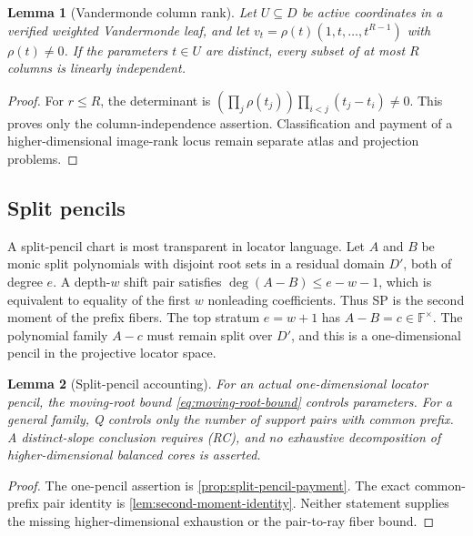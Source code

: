 \documentclass[12pt,a4paper]{amsart}
\numberwithin{equation}{section}
\newtheorem{lemma}[lemma]{Lemma}
\theoremstyle{remark}
\newcommand{\F}{\mathbb F}
\begin{document}
\begin{lemma}[Vandermonde column rank]\label{lem:vandermonde-image-rank-expanded}
Let \(U\subseteq D\) be active coordinates in a verified weighted
Vandermonde leaf, and let \(v_t=\rho(t)(1,t,\ldots,t^{R-1})\) with
\(\rho(t)\ne0\).  If the parameters \(t\in U\) are distinct, every subset
of at most \(R\) columns is linearly independent.
\end{lemma}

\begin{proof}
For \(r\le R\), the determinant is
\((\prod_j\rho(t_j))\prod_{i<j}(t_j-t_i)\ne0\).  This proves only the
column-independence assertion.  Classification and payment of a
higher-dimensional image-rank locus remain separate atlas and projection
problems.
\end{proof}

\subsection*{Split pencils}
A split-pencil chart is most transparent in locator language.  Let \(A\) and \(B\) be monic split polynomials with disjoint root sets in a residual domain \(D'\), both of degree \(e\).  A depth-\(w\) shift pair satisfies \(\deg(A-B)\le e-w-1\), which is equivalent to equality of the first \(w\) nonleading coefficients.  Thus SP is the second moment of the prefix fibers.  The top stratum \(e=w+1\) has \(A-B=c\in\F^\times\).  The polynomial family \(A-c\) must remain split over \(D'\), and this is a one-dimensional pencil in the projective locator space.

\begin{lemma}[Split-pencil accounting]\label{lem:split-pencil-alternatives-expanded}
For an actual one-dimensional locator pencil, the moving-root bound
\eqref{eq:moving-root-bound} controls parameters.  For a general family,
Q controls only the number of support pairs with common prefix.  A
distinct-slope conclusion requires \textup{(RC)}, and no exhaustive
decomposition of higher-dimensional balanced cores is asserted.
\end{lemma}

\begin{proof}
The one-pencil assertion is \cref{prop:split-pencil-payment}.  The exact
common-prefix pair identity is \cref{lem:second-moment-identity}.  Neither
statement supplies the missing higher-dimensional exhaustion or the
pair-to-ray fiber bound.
\end{proof}
\end{document}
